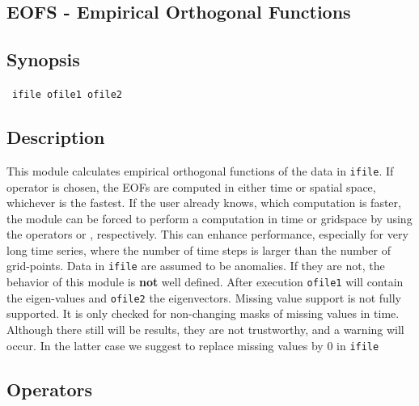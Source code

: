 

\newpage
\subsection{EOFS - Empirical Orthogonal Functions}
\label{EOFS}
\label{eof}
\label{eoftime}
\label{eofspatial}

\subsection*{Synopsis}

 \ {\tt ifile ofile1 ofile2}


\subsection*{Description}

\setlength{\miniwidth}{\textwidth}
\addtolength{\miniwidth}{-8mm}
\hspace*{8mm}\begin{minipage}{\miniwidth}
This module calculates empirical orthogonal functions of the data in {\tt ifile}.
If operator {} is chosen, the EOFs are computed in either time or spatial
space, whichever is the fastest. If the user already knows, which computation
is faster, the module can be forced to perform a computation in time or gridspace
by using the operators {} or {}, respectively. This can enhance 
performance, especially for very long time series, where the number of time steps
is larger than the number of grid-points.
Data in {\tt ifile} are assumed to be anomalies. If they are not, the behavior 
of this module is {\bf not} well defined. 
After execution {\tt ofile1} will contain the eigen-values and {\tt ofile2} the
eigenvectors.
Missing value support is not fully supported. It is only checked for non-changing
masks of missing values in time. Although there still will be results, they are
not trustworthy, and a warning will occur. In the latter case we suggest to 
replace missing values by 0 in {\tt ifile} 
\end{minipage}
\addtolength{\miniwidth}{8mm}

\subsection*{Operators}

